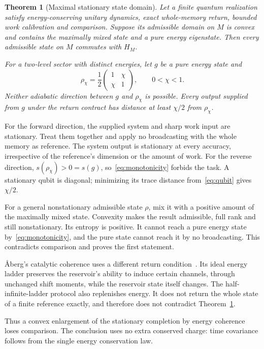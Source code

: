 \documentclass[11pt,a4paper]{article}
\newtheorem{theorem}{Theorem}
\begin{document}
\begin{theorem}[Maximal stationary state domain]\label{thm:coherence}
Let a finite quantum realization satisfy energy-conserving unitary dynamics, exact whole-memory return, bounded work calibration and comparison. Suppose its admissible domain on $M$ is convex and contains the maximally mixed state and a pure energy eigenstate. Then every admissible state on $M$ commutes with $H_M$.

For a two-level sector with distinct energies, let $g$ be a pure energy state and
\begin{equation}
 \rho_\chi=\frac12\begin{pmatrix}1&\chi\\\chi&1\end{pmatrix},\qquad 0<\chi<1. \label{eq:qubit}
\end{equation}
Neither adiabatic direction between $g$ and $\rho_\chi$ is possible. Every output supplied from $g$ under the return contract has distance at least $\chi/2$ from $\rho_\chi$.
\end{theorem}

For the forward direction, the supplied system and sharp work input are stationary. Treat them together and apply no broadcasting with the whole memory as reference. The system output is stationary at every accuracy, irrespective of the reference's dimension or the amount of work. For the reverse direction, $s(\rho_\chi)>0=s(g)$, so~\eqref{eq:monotonicity} forbids the task. A stationary qubit is diagonal; minimizing its trace distance from~\eqref{eq:qubit} gives $\chi/2$.

For a general nonstationary admissible state $\rho$, mix it with a positive amount of the maximally mixed state. Convexity makes the result admissible, full rank and still nonstationary. Its entropy is positive. It cannot reach a pure energy state by~\eqref{eq:monotonicity}, and the pure state cannot reach it by no broadcasting. This contradicts comparison and proves the first statement.

\AA berg's catalytic coherence uses a different return condition~\cite{aberg}. Its ideal energy ladder preserves the reservoir's ability to induce certain channels, through unchanged shift moments, while the reservoir state itself changes. The half-infinite-ladder protocol also replenishes energy. It does not return the whole state of a finite reference exactly, and therefore does not contradict Theorem~\ref{thm:coherence}.

Thus a convex enlargement of the stationary completion by energy coherence loses comparison. The conclusion uses no extra conserved charge: time covariance follows from the single energy conservation law.
\end{document}
